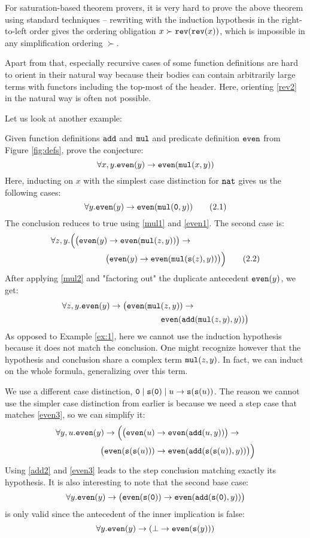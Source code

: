 For saturation-based theorem provers, it is very hard to prove the above theorem using standard techniques -- rewriting with the induction hypothesis in the right-to-left order gives the ordering obligation $x \succ \mathtt{rev}(\mathtt{rev}(x))$, which is impossible in any simplification ordering $\succ$.

Apart from that, especially recursive cases of some function definitions are hard to orient in their natural way because their bodies can contain arbitrarily large terms with functors including the top-most of the header. Here, orienting \eqref{rev2} in the natural way is often not possible.

Let us look at another example:
\begin{example}\label{ex:2}
	Given function definitions $\mathtt{add}$ and $\mathtt{mul}$ and predicate definition $\mathtt{even}$ from Figure \ref{fig:defs}, prove the conjecture:
	$$\forall x,y. \mathtt{even}(y)\rightarrow \mathtt{even}(\mathtt{mul}(x,y))$$
	Here, inducting on $x$ with the simplest case distinction for $\mathtt{nat}$ gives us the following cases:
	\begin{equation}\forall y. \mathtt{even}(y)\rightarrow \mathtt{even}(\mathtt{mul}(\mathtt{0},y))\tag{2.1}\end{equation}
	The conclusion reduces to true using \eqref{mul1} and \eqref{even1}. The second case is:
	\begin{align}\forall z,y. \Big(\big(\mathtt{even}(y)\rightarrow \mathtt{even}&(\mathtt{mul}(z,y))\big)\rightarrow\nonumber\\
	\big(\mathtt{even}(y)&\rightarrow \mathtt{even}(\mathtt{mul}(\mathtt{s}(z),y))\big)\Big)\tag{2.2}\end{align}
	After applying \eqref{mul2} and "factoring out" the duplicate antecedent $\mathtt{even}(y)$, we get:
	\begin{align}\nonumber\forall z,y. \mathtt{even}(y)\rightarrow\big(\mathtt{even}(\mathtt{mul}&(z,y))\rightarrow\\
	\nonumber&\mathtt{even}(\mathtt{add}(\mathtt{mul}(z,y),y))\big)\end{align}
	As opposed to Example \ref{ex:1}, here we cannot use the induction hypothesis because it does not match the conclusion. One might recognize however that the hypothesis and conclusion share a complex term $\mathtt{mul}(z,y)$. In fact, we can induct on the whole formula, generalizing over this term.

	We use a different case distinction, $\mathtt{0}\mid\mathtt{s}(\mathtt{0})\mid u\rightarrow\mathtt{s}(\mathtt{s}(u))$. The reason we cannot use the simpler case distinction from earlier is because we need a step case that matches \eqref{even3}, so we can simplify it:
    \begin{align}\nonumber\forall y,u. \mathtt{even}(y)\rightarrow\Big(\big(\mathtt{even}(u)&\rightarrow\mathtt{even}(\mathtt{add}(u,y))\big)\rightarrow\\
    \nonumber\big(\mathtt{even}(\mathtt{s}(\mathtt{s}(u)))&\rightarrow\mathtt{even}(\mathtt{add}(\mathtt{s}(\mathtt{s}(u)),y))\big)\Big)\end{align}
    Using \eqref{add2} and \eqref{even3} leads to the step conclusion matching exactly its hypothesis. It is also interesting to note that the second base case:
	$$\forall y. \mathtt{even}(y)\rightarrow\big(\mathtt{even}(\mathtt{s}(\mathtt{0}))\rightarrow
	\mathtt{even}(\mathtt{add}(\mathtt{s}(\mathtt{0}),y))\big)$$
	is only valid since the antecedent of the inner implication is false:
	$$\forall y. \mathtt{even}(y)\rightarrow(\bot\rightarrow\mathtt{even}(\mathtt{s}(y)))$$
\end{example}

